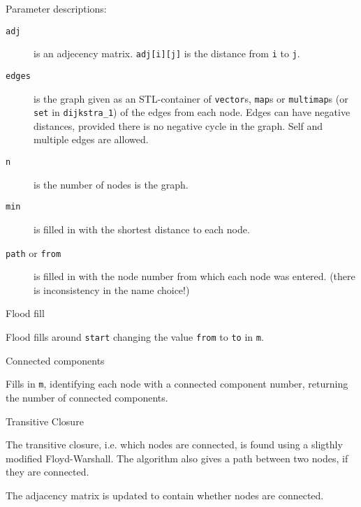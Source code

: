 
Parameter descriptions:
\begin{description}
\item[{\tt adj}] is an adjecency matrix. {\tt adj[i][j]} is the distance
   from {\tt i} to {\tt j}.
\item[{\tt edges}] is the graph given as an STL-container of
   {\tt vector}s, {\tt map}s or {\tt multimap}s
   (or {\tt set} in {\tt dijkstra\_1}) of the edges from each node.
   Edges can have negative distances, provided there is no negative cycle in
   the graph.
   Self and multiple edges are allowed.
\item[{\tt n}] is the number of nodes is the graph.
\item[{\tt min}] is filled in with the shortest distance to each node.
\item[{\tt path} or {\tt from}] is filled in with the node number from which
   each node was entered. (there is inconsistency in the name choice!)
\end{description}

\begin{algorithm}{Flood fill}

Flood fills around {\tt start} changing the value {\tt from} to {\tt to}
in {\tt m}.
\end{algorithm}

\begin{algorithm}{Connected components}

Fills in {\tt m}, identifying each node with a connected component number,
returning the number of connected components.
\end{algorithm}

\begin{algorithm}{Transitive Closure}

The transitive closure, i.e. which nodes are connected, is found using
a sligthly modified Floyd-Warshall. The algorithm also gives a path between
two nodes, if they are connected.

The adjacency matrix is updated to contain whether nodes are connected.
\end{algorithm}

